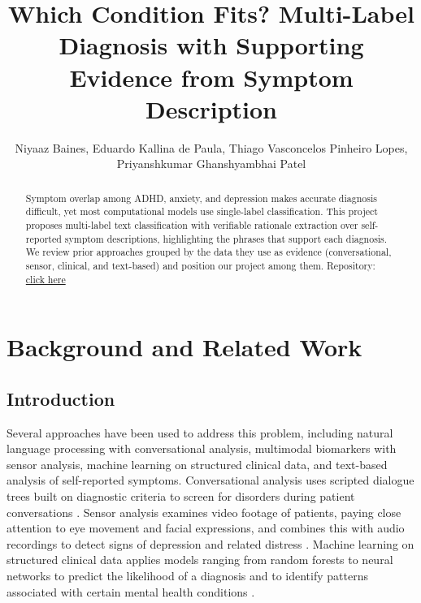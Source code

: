 \documentclass[sigconf]{acmart}
\begin{document}
\title{Which Condition Fits? Multi-Label Diagnosis with Supporting Evidence from Symptom Description}


\author{Niyaaz Baines, Eduardo Kallina de Paula, Thiago Vasconcelos Pinheiro Lopes, Priyanshkumar Ghanshyambhai Patel}

\begin{abstract}
Symptom overlap among ADHD, anxiety, and depression makes accurate diagnosis difficult, yet most computational models use single-label classification. This project proposes multi-label text classification with verifiable rationale extraction over self-reported symptom descriptions, highlighting the phrases that support each diagnosis. We review prior approaches grouped by the data they use as evidence (conversational, sensor, clinical, and text-based) and position our project among them. Repository: \href{https://github.com/eduardokdp/Data-Mining-Diagnosis}{click here}
\end{abstract}


\maketitle

\section{Background and Related Work}

\subsection{Introduction}
Several approaches have been used to address this problem, including natural language processing with conversational analysis, multimodal biomarkers with sensor analysis, machine learning on structured clinical data, and text-based analysis of self-reported symptoms. Conversational analysis uses scripted dialogue trees built on diagnostic criteria to screen for disorders during patient conversations \cite{philip2017virtual}. Sensor analysis examines video footage of patients, paying close attention to eye movement and facial expressions, and combines this with audio recordings to detect signs of depression and related distress \cite{alghowinem2013eye, cummins2015review, gratch2014distress}. Machine learning on structured clinical data applies models ranging from random forests to neural networks to predict the likelihood of a diagnosis and to identify patterns associated with certain mental health conditions \cite{tate2020predicting}.
\end{document}
